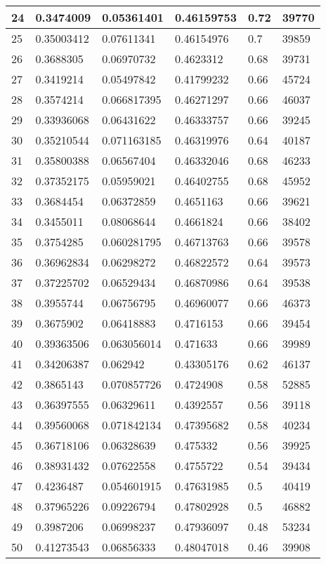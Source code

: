 \begin{longtable}{|l|l|l|l|l|l|}
24 & 0.3474009 & 0.05361401 & 0.46159753 & 0.72 & 39770 \\ \hline 
25 & 0.35003412 & 0.07611341 & 0.46154976 & 0.7 & 39859 \\ \hline 
26 & 0.3688305 & 0.06970732 & 0.4623312 & 0.68 & 39731 \\ \hline 
27 & 0.3419214 & 0.05497842 & 0.41799232 & 0.66 & 45724 \\ \hline 
28 & 0.3574214 & 0.066817395 & 0.46271297 & 0.66 & 46037 \\ \hline 
29 & 0.33936068 & 0.06431622 & 0.46333757 & 0.66 & 39245 \\ \hline 
30 & 0.35210544 & 0.071163185 & 0.46319976 & 0.64 & 40187 \\ \hline 
31 & 0.35800388 & 0.06567404 & 0.46332046 & 0.68 & 46233 \\ \hline 
32 & 0.37352175 & 0.05959021 & 0.46402755 & 0.68 & 45952 \\ \hline 
33 & 0.3684454 & 0.06372859 & 0.4651163 & 0.66 & 39621 \\ \hline 
34 & 0.3455011 & 0.08068644 & 0.4661824 & 0.66 & 38402 \\ \hline 
35 & 0.3754285 & 0.060281795 & 0.46713763 & 0.66 & 39578 \\ \hline 
36 & 0.36962834 & 0.06298272 & 0.46822572 & 0.64 & 39573 \\ \hline 
37 & 0.37225702 & 0.06529434 & 0.46870986 & 0.64 & 39538 \\ \hline 
38 & 0.3955744 & 0.06756795 & 0.46960077 & 0.66 & 46373 \\ \hline 
39 & 0.3675902 & 0.06418883 & 0.4716153 & 0.66 & 39454 \\ \hline 
40 & 0.39363506 & 0.063056014 & 0.471633 & 0.66 & 39989 \\ \hline 
41 & 0.34206387 & 0.062942 & 0.43305176 & 0.62 & 46137 \\ \hline 
42 & 0.3865143 & 0.070857726 & 0.4724908 & 0.58 & 52885 \\ \hline 
43 & 0.36397555 & 0.06329611 & 0.4392557 & 0.56 & 39118 \\ \hline 
44 & 0.39560068 & 0.071842134 & 0.47395682 & 0.58 & 40234 \\ \hline 
45 & 0.36718106 & 0.06328639 & 0.475332 & 0.56 & 39925 \\ \hline 
46 & 0.38931432 & 0.07622558 & 0.4755722 & 0.54 & 39434 \\ \hline 
47 & 0.4236487 & 0.054601915 & 0.47631985 & 0.5 & 40419 \\ \hline 
48 & 0.37965226 & 0.09226794 & 0.47802928 & 0.5 & 46882 \\ \hline 
49 & 0.3987206 & 0.06998237 & 0.47936097 & 0.48 & 53234 \\ \hline 
50 & 0.41273543 & 0.06856333 & 0.48047018 & 0.46 & 39908 \\ \hline 
\end{longtable}